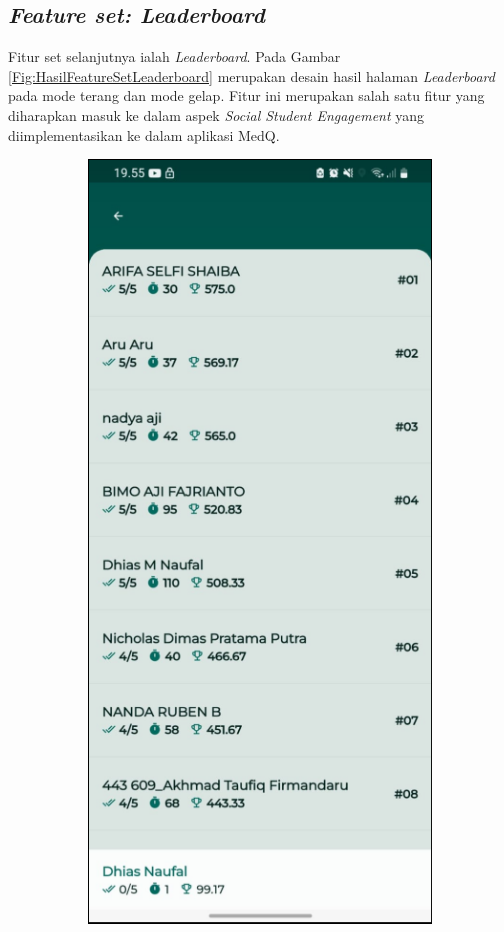 \subsection{\textit{Feature set: Leaderboard}}
Fitur set selanjutnya ialah \textit{Leaderboard}. Pada Gambar \ref*{Fig:HasilFeatureSetLeaderboard} merupakan desain hasil halaman \textit{Leaderboard} pada mode terang dan mode gelap.
Fitur ini merupakan salah satu fitur yang diharapkan masuk ke dalam aspek \textit{Social Student Engagement} yang diimplementasikan ke dalam aplikasi MedQ.
\begin{figure}[H]
	\centering
	\begin{subfigure}[b]{0.26\textwidth}
		\centering
	  \includegraphics[width=\linewidth]{contents/chapter-3/images/HF-Leaderboard.png}

\end{subfigure}
\end{figure}
